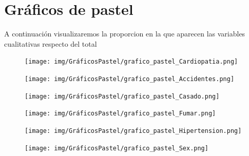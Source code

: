 \documentclass[a4paper, 12pt]{article}
\begin{document}
\newpage
\section{Gráficos de pastel}
A continuación visualizaremos la proporcion en la que aparecen las variables cualitativas respecto del total

\begin{figure}[H]
    \centering
    \begin{minipage}{0.45\textwidth}
        \centering
        \texttt{[image: img/GráficosPastel/grafico\_pastel\_Cardiopatia.png]}
    \end{minipage}
    \begin{minipage}{0.45\textwidth}
        \centering
        \texttt{[image: img/GráficosPastel/grafico\_pastel\_Accidentes.png]}
    \end{minipage}
    \vfill
    \begin{minipage}{0.45\textwidth}
        \centering
        \texttt{[image: img/GráficosPastel/grafico\_pastel\_Casado.png]}
    \end{minipage}
    \begin{minipage}{0.45\textwidth}
        \centering
        \texttt{[image: img/GráficosPastel/grafico\_pastel\_Fumar.png]}
    \end{minipage}
    \vfill
    \begin{minipage}{0.45\textwidth}
        \centering
        \texttt{[image: img/GráficosPastel/grafico\_pastel\_Hipertension.png]}
    \end{minipage}
    \begin{minipage}{0.45\textwidth}
        \centering
        \texttt{[image: img/GráficosPastel/grafico\_pastel\_Sex.png]}
    \end{minipage}
    \vfill
\end{figure}

\newpage
\end{document}
